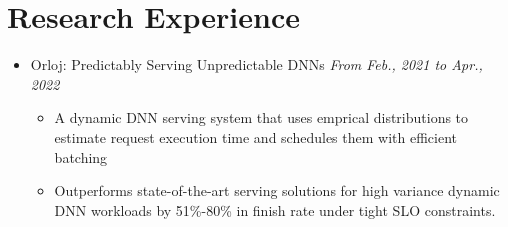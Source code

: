 \documentclass[letterpaper,11pt]{article}
\begin{document}
\section{Research Experience}
\begin{itemize}
    \item Orloj: Predictably Serving Unpredictable DNNs
        \hfill \textit{From Feb., 2021 to Apr., 2022}
    \begin{itemize}
        \item A dynamic DNN serving system that uses emprical distributions to
        estimate request execution time and schedules them with efficient batching
        \item Outperforms state-of-the-art serving solutions for high variance
        dynamic DNN workloads by 51\%-80\% in finish rate under tight SLO constraints.
    \end{itemize}
\end{itemize}
\end{document}
